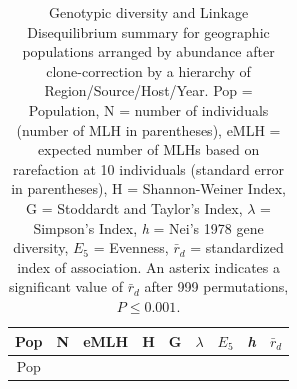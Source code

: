 \documentclass[fleqn,10pt,lineno]{wlpeerj} %
\theoremstyle{definition}
\theoremstyle{definition}
\theoremstyle{definition}
\theoremstyle{remark}
\begin{document}
\newpage

\begin{longtable}[]{@{}crrrrllrl@{}}
\caption{\label{tab:iatab} Genotypic diversity and Linkage Disequilibrium
summary for geographic populations arranged by abundance after
clone-correction by a hierarchy of Region/Source/Host/Year. Pop =
Population, N = number of individuals (number of MLH in parentheses),
eMLH = expected number of MLHs based on rarefaction at 10 individuals
(standard error in parentheses), H = Shannon-Weiner Index, G = Stoddardt
and Taylor's Index, \(\lambda\) = Simpson's Index, \emph{h} = Nei's 1978
gene diversity, \(E_5\) = Evenness, \(\bar{r}_d\) = standardized index
of association. An asterix indicates a significant value of
\(\bar{r}_d\) after 999 permutations, \(P \leq 0.001\).}\tabularnewline
\toprule
\begin{minipage}[b]{0.12\columnwidth}\centering\strut
Pop\strut
\end{minipage} & \begin{minipage}[b]{0.08\columnwidth}\raggedleft\strut
N\strut
\end{minipage} & \begin{minipage}[b]{0.13\columnwidth}\raggedleft\strut
eMLH\strut
\end{minipage} & \begin{minipage}[b]{0.04\columnwidth}\raggedleft\strut
H\strut
\end{minipage} & \begin{minipage}[b]{0.05\columnwidth}\raggedleft\strut
G\strut
\end{minipage} & \begin{minipage}[b]{0.11\columnwidth}\raggedright\strut
\(\lambda\)\strut
\end{minipage} & \begin{minipage}[b]{0.06\columnwidth}\raggedright\strut
\(E_5\)\strut
\end{minipage} & \begin{minipage}[b]{0.06\columnwidth}\raggedleft\strut
\emph{h}\strut
\end{minipage} & \begin{minipage}[b]{0.07\columnwidth}\raggedright\strut
\(\bar{ r}_d\)\strut
\end{minipage}\tabularnewline
\midrule
\endfirsthead
\toprule
\begin{minipage}[b]{0.12\columnwidth}\centering\strut
Pop\strut
\end{minipage} & \begin{minipage}[b]{0.08\columnwidth}\raggedleft\strut

\end{minipage}
\end{longtable}
\end{document}
